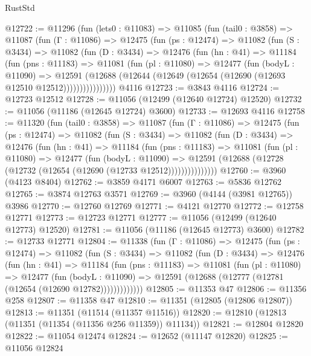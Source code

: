 \begin{lexlean}{RustStd}
\begin{coremodule}
@12722 := @11296
    (fun (lets0 : @11083) =>
    @11085
      (fun (tail0 : @3858) =>
      @11087
        (fun (Γ : @11086) =>
        @12475
          (fun (ps : @12474) =>
          @11082
            (fun (S : @3434) =>
            @11082
              (fun (D : @3434) =>
              @12476
                (fun (hn : @41) =>
                @11184
                  (fun (pns : @11183) =>
                  @11081
                    (fun (pl : @11080) =>
                    @12477
                      (fun (bodyL : @11090) =>
                      @12591
                        (@12688
                          (@12644 (@12649 (@12654 (@12690 (@12693 @12510 @12512))))))))))))))))
    @4116
@12723 := @3843 @4116
@12724 := @12723 @12512
@12728 := @11056 (@12499 (@12640 @12724) @12520)
@12732 := @11056 (@11186 (@12645 @12724) @3600)
@12733 := @12693 @4116
@12758 := @11320
    (fun (tail0 : @3858) =>
    @11087
      (fun (Γ : @11086) =>
      @12475
        (fun (ps : @12474) =>
        @11082
          (fun (S : @3434) =>
          @11082
            (fun (D : @3434) =>
            @12476
              (fun (hn : @41) =>
              @11184
                (fun (pns : @11183) =>
                @11081
                  (fun (pl : @11080) =>
                  @12477
                    (fun (bodyL : @11090) =>
                    @12591 (@12688 (@12728 (@12732 (@12654 (@12690 (@12733 @12512)))))))))))))))
@12760 := @3960 (@4123 @8404)
@12762 := @3859 @4171 @6007
@12763 := @5836 @12762
@12765 := @3874 @12763 @3571
@12769 := @3960 (@4144 (@3981 @12765)) @3986
@12770 := @12760 @12769
@12771 := @4121 @12770
@12772 := @12758 @12771
@12773 := @12723 @12771
@12777 := @11056 (@12499 (@12640 @12773) @12520)
@12781 := @11056 (@11186 (@12645 @12773) @3600)
@12782 := @12733 @12771
@12804 := @11338
    (fun (Γ : @11086) =>
    @12475
      (fun (ps : @12474) =>
      @11082
        (fun (S : @3434) =>
        @11082
          (fun (D : @3434) =>
          @12476
            (fun (hn : @41) =>
            @11184
              (fun (pns : @11183) =>
              @11081
                (fun (pl : @11080) =>
                @12477
                  (fun (bodyL : @11090) =>
                  @12591 (@12688 (@12777 (@12781 (@12654 (@12690 @12782)))))))))))))
@12805 := @11353 @47
@12806 := @11356 @258
@12807 := @11358 @47
@12810 := @11351 (@12805 (@12806 @12807))
@12813 := @11351 (@11514 (@11357 @11516))
@12820 := @12810 (@12813 (@11351 (@11354 (@11356 @256 @11359)) @11134))
@12821 := @12804 @12820
@12822 := @11054 @12474
@12824 := @12652 (@11147 @12820)
@12825 := @11056 @12824

\end{coremodule}
\end{lexlean}
